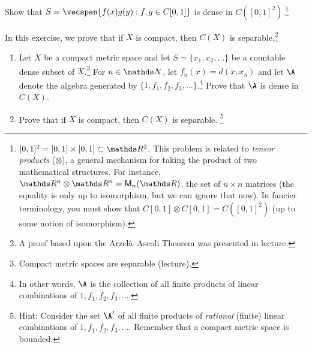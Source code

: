 \documentclass{../homework}
\author{}
\begin{document}
\begin{Exercise}
	Show that $S = \vecspan \{ f(x)g(y) : f,g\in C[0,1]\}$ is dense in
  $C( [0,1]^2)$.\footnote{$[0,1]^2=[0,1] \times [0,1] \subset \R^2$.
    This problem is related to \emph{tensor products} ($\otimes$), a
    general mechanism for taking the product of two mathematical
    structures.  For instance, $\R^n \otimes \R^n = \mathsf{M}_n(\R)$,
    the set of $n \times n$ matrices (the equality is only up to
    isomorphism, but we can ignore that now).  In fancier terminology,
    you must show that $C[0,1] \otimes C[0,1] = C( [0,1]^2)$ (up to
    some notion of isomorphism).}

  \begin{solution}

  \end{solution}
\end{Exercise}

\begin{Exercise}
	In this exercise, we prove that if $X$ is compact, then $C(X)$ is
  separable.\footnote{A proof based upon the Arzel\`a--Ascoli Theorem
    was presented in lecture.}
	\begin{enumerate}
  \item Let $X$ be a compact metric space and let
    $S = \{x_1,x_2,\ldots\}$ be a countable dense subset of
    $X$.\footnote{Compact metric spaces are separable (lecture).}  For
    $n \in \N$, let $f_n(x) = d(x,x_n)$ and let $\A$ denote the
    algebra generated by $\{1, f_1,f_2,f_3,\ldots\}$.\footnote{In
      other words, $\A$ is the collection of all finite products of
      linear combinations of $1, f_1,f_2,f_3,\ldots$.}  Prove that
    $\A$ is dense in $C(X)$.

    \begin{solution}

    \end{solution}

  \item Prove that if $X$ is compact, then $C(X)$ is separable.
    \footnote{Hint: Consider the set $\A'$ of all finite products of
      \emph{rational} (finite) linear combinations of
      $1, f_1,f_2,f_3,\ldots$.  Remember that a compact metric space
      is bounded.}

    \begin{solution}

    \end{solution}
	\end{enumerate}
\end{Exercise}
\end{document}
